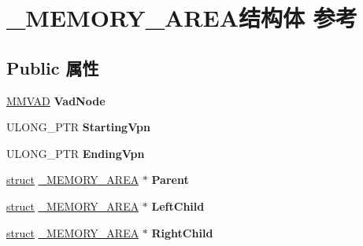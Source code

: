 \hypertarget{struct___m_e_m_o_r_y___a_r_e_a}{}\section{\+\_\+\+M\+E\+M\+O\+R\+Y\+\_\+\+A\+R\+E\+A结构体 参考}
\label{struct___m_e_m_o_r_y___a_r_e_a}
\subsection*{Public 属性}
\begin{DoxyCompactItemize}
\item 
\mbox{\label{struct___m_e_m_o_r_y___a_r_e_a_ada3e9bbdc69e1d0c0b8cb645b43d809a}} 
\hyperlink{struct___m_m_v_a_d}{M\+M\+V\+AD} {\bfseries Vad\+Node}
\item 
\mbox{\label{struct___m_e_m_o_r_y___a_r_e_a_a4c2e69b93741b5727fb08e34b1262af2}} 
U\+L\+O\+N\+G\+\_\+\+P\+TR {\bfseries Starting\+Vpn}
\item 
\mbox{\label{struct___m_e_m_o_r_y___a_r_e_a_aeea8c7024d0a41f703e2ecb7acad2f29}} 
U\+L\+O\+N\+G\+\_\+\+P\+TR {\bfseries Ending\+Vpn}
\item 
\mbox{\label{struct___m_e_m_o_r_y___a_r_e_a_a87f77f1f8f20762d5ffd055fdefe8636}} 
\hyperlink{interfacestruct}{struct} \hyperlink{struct___m_e_m_o_r_y___a_r_e_a}{\+\_\+\+M\+E\+M\+O\+R\+Y\+\_\+\+A\+R\+EA} $\ast$ {\bfseries Parent}
\item 
\mbox{\label{struct___m_e_m_o_r_y___a_r_e_a_ae2831ab953e8fd5ec16174ce16db0dc5}} 
\hyperlink{interfacestruct}{struct} \hyperlink{struct___m_e_m_o_r_y___a_r_e_a}{\+\_\+\+M\+E\+M\+O\+R\+Y\+\_\+\+A\+R\+EA} $\ast$ {\bfseries Left\+Child}
\item 
\mbox{\label{struct___m_e_m_o_r_y___a_r_e_a_ad9b3ecb074847f503c53bb831db94320}} 
\hyperlink{interfacestruct}{struct} \hyperlink{struct___m_e_m_o_r_y___a_r_e_a}{\+\_\+\+M\+E\+M\+O\+R\+Y\+\_\+\+A\+R\+EA} $\ast$ {\bfseries Right\+Child}
\item 
\mbox{\label{struct___m_e_m_o_r_y___a_r_e_a_aca64e884b1e654032594c5b2ee5c4141}} 

\end{DoxyCompactItemize}
